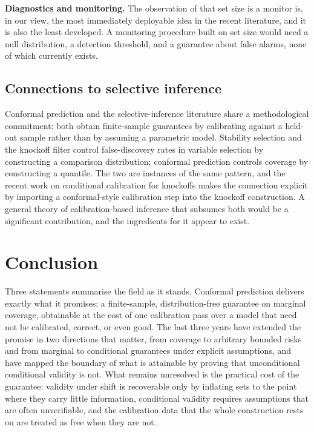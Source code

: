 \documentclass[a4paper,longmktitle]{cas-sc}
\begin{document}
\textbf{Diagnostics and monitoring.} The observation of \cite{Alur2026} that set size is a monitor is, in our view, the most immediately deployable idea in the recent literature, and it is also the least developed. A monitoring procedure built on set size would need a null distribution, a detection threshold, and a guarantee about false alarms, none of which currently exists.

\subsection{Connections to selective inference}

Conformal prediction and the selective-inference literature share a methodological commitment: both obtain finite-sample guarantees by calibrating against a held-out sample rather than by assuming a parametric model. Stability selection \cite{Meinshausen2010} and the knockoff filter \cite{Barber2015,Candès2018} control false-discovery rates in variable selection by constructing a comparison distribution; conformal prediction controls coverage by constructing a quantile. The two are instances of the same pattern, and the recent work on conditional calibration for knockoffs \cite{Luo2025} makes the connection explicit by importing a conformal-style calibration step into the knockoff construction. A general theory of calibration-based inference that subsumes both would be a significant contribution, and the ingredients for it appear to exist.

\section{Conclusion}

Three statements summarise the field as it stands. Conformal prediction delivers exactly what it promises: a finite-sample, distribution-free guarantee on marginal coverage, obtainable at the cost of one calibration pass over a model that need not be calibrated, correct, or even good. The last three years have extended the promise in two directions that matter, from coverage to arbitrary bounded risks and from marginal to conditional guarantees under explicit assumptions, and have mapped the boundary of what is attainable by proving that unconditional conditional validity is not. What remains unresolved is the practical cost of the guarantee: validity under shift is recoverable only by inflating sets to the point where they carry little information, conditional validity requires assumptions that are often unverifiable, and the calibration data that the whole construction rests on are treated as free when they are not.
\end{document}
